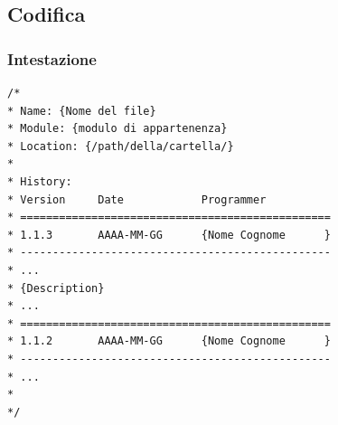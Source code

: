 

\subsection{Codifica}

\subsubsection{Intestazione}

\begin{lstlisting}
/*
* Name: {Nome del file}
* Module: {modulo di appartenenza}
* Location: {/path/della/cartella/}
*
* History:
* Version     Date            Programmer    
* ================================================
* 1.1.3       AAAA-MM-GG      {Nome Cognome      }
* ------------------------------------------------
* ...
* {Description}
* ...
* ================================================
* 1.1.2       AAAA-MM-GG      {Nome Cognome      }
* ------------------------------------------------
* ...
*
*/
\end{lstlisting}


